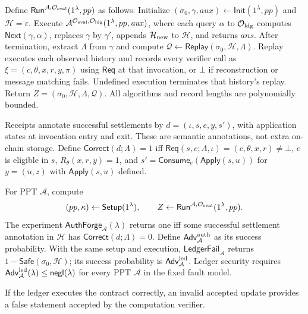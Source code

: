 \documentclass[runningheads,orivec]{llncs}
\newcommand{\Setup}{\mathsf{Setup}}
\newcommand{\Req}{\mathsf{Req}}
\newcommand{\Init}{\mathsf{Init}}
\newcommand{\Next}{\mathsf{Next}}
\newcommand{\Run}{\mathsf{Run}}
\newcommand{\Replay}{\mathsf{Replay}}
\newcommand{\Safe}{\mathsf{Safe}}
\newcommand{\Correct}{\mathsf{Correct}}
\newcommand{\Apply}{\mathsf{Apply}}
\newcommand{\Consume}{\mathsf{Consume}}
\newcommand{\Adv}{\mathsf{Adv}}
\newcommand{\EvalO}{\mathcal O_{\rm eval}}
\newcommand{\LdgO}{\mathcal O_{\rm ldg}}
\newcommand{\negl}{\mathsf{negl}}
\begin{document}
Define $\Run^{\mathcal A,\EvalO}(1^\lambda,pp)$ as follows. Initialize $(\sigma_0,\gamma,\mathit{aux})\leftarrow\Init(1^\lambda,pp)$ and $\mathcal H=\varepsilon$. Execute $\mathcal A^{\EvalO,\LdgO}(1^\lambda,pp,\mathit{aux})$, where each query $\alpha$ to $\LdgO$ computes $\Next(\gamma,\alpha)$, replaces $\gamma$ by $\gamma'$, appends $\mathcal H_{\rm new}$ to $\mathcal H$, and returns $\mathit{ans}$. After termination, extract $\Lambda$ from $\gamma$ and compute $\mathcal Q\gets\Replay(\sigma_0,\mathcal H,\Lambda)$. Replay executes each observed history and records every verifier call as $\xi=(c,\theta,x,r,y,\pi)$ using $\Req$ at that invocation, or $\bot$ if reconstruction or message matching fails. Undefined execution terminates that history's replay. Return $Z=(\sigma_0,\mathcal H,\Lambda,\mathcal Q)$. All algorithms and record lengths are polynomially bounded.

Receipts annotate successful settlements by $d=(\iota,s,e,y,s')$, with application states at invocation entry and exit. These are semantic annotations, not extra on-chain storage. Define $\Correct(d;\Lambda)=1$ iff $\Req(s,e;\Lambda,\iota)=(c,\theta,x,r)\ne\bot$, $e$ is eligible in $s$, $R_\theta(x,r,y)=1$, and $s'=\Consume_e(\Apply(s,u))$ for $y=(u,z)$ with $\Apply(s,u)$ defined.

\begin{definition}\label{def:auth}
For PPT $\mathcal A$, compute
\[
 (pp,\kappa)\leftarrow\Setup(1^\lambda),\qquad
 Z\leftarrow\Run^{\mathcal A,\EvalO}(1^\lambda,pp).
\]
The experiment $\mathsf{AuthForge}_{\mathcal A}(\lambda)$ returns one iff some successful settlement annotation in $\mathcal H$ has $\Correct(d;\Lambda)=0$. Define $\Adv^{\rm auth}_{\mathcal A}$ as its success probability. With the same setup and execution, $\mathsf{LedgerFail}_{\mathcal A}$ returns $1-\Safe(\sigma_0,\mathcal H)$; its success probability is $\Adv^{\rm led}_{\mathcal A}$. Ledger security requires $\Adv^{\rm led}_{\mathcal A}(\lambda)\leq\negl(\lambda)$ for every PPT $\mathcal A$ in the fixed fault model.
\end{definition}
If the ledger executes the contract correctly, an invalid accepted update provides a false statement accepted by the computation verifier.
\end{document}
